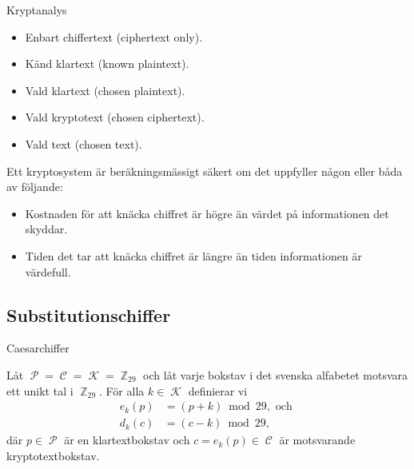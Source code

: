 \documentclass{beamer}
\theoremstyle{definition}
\DeclareMathOperator{\p}{\mathcal{P}}
\let\P\p
\DeclareMathOperator{\C}{\mathcal{C}}
\DeclareMathOperator{\K}{\mathcal{K}}
\DeclareMathOperator{\Z}{\mathbb{Z}}
\let\stoch\mathbf
\renewcommand{\p}{\stoch P}
\begin{document}
\begin{frame}{\insertsubsectionhead}{Kryptanalys}
  \begin{itemize}
    \item Enbart chiffertext (ciphertext only).
    \item Känd klartext (known plaintext).
    \item Vald klartext (chosen plaintext).
    \item Vald kryptotext (chosen ciphertext).
    \item Vald text (chosen text).
  \end{itemize}
\end{frame}

\begin{frame}{\insertsubsectionhead}
  \begin{definition}
    Ett kryptosystem är beräkningsmässigt säkert om det uppfyller någon eller 
    båda av följande:
    \begin{itemize}
      \item Kostnaden för att knäcka chiffret är högre än värdet på 
        informationen det skyddar.
      \item Tiden det tar att knäcka chiffret är längre än tiden informationen 
        är värdefull.
    \end{itemize}
  \end{definition}
\end{frame}

\subsection{Substitutionschiffer}

\begin{frame}{\insertsubsectionhead}{Caesarchiffer}
  \begin{definition}[Skiftchiffer]\label{def:shiftCipher}
    Låt \(\P = \C = \K = \Z_{29}\) och låt varje bokstav i det svenska 
    alfabetet motsvara ett unikt tal i \(\Z_{29}\).
    För alla \(k\in \K\) definierar vi
    \begin{align}
      \nonumber
      e_k(p) &= (p + k) \bmod 29, \text{ och } \\
      \nonumber
      d_k(c) &= (c - k) \bmod 29,
    \end{align}
    där \(p\in \P\) är en klartextbokstav och \(c = e_k(p)\in \C\) är 
    motsvarande kryptotextbokstav.
  \end{definition}
\end{frame}
\end{document}
